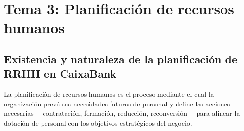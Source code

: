 %
%
%
%

\section{Tema 3: Planificación de recursos humanos}

\subsection{Existencia y naturaleza de la planificación de RRHH en CaixaBank}


La planificación de recursos humanos es el proceso mediante el cual la
organización prevé sus necesidades futuras de personal y define las acciones
necesarias —contratación, formación, reducción, reconversión— para alinear
la dotación de personal con los objetivos estratégicos del negocio.


